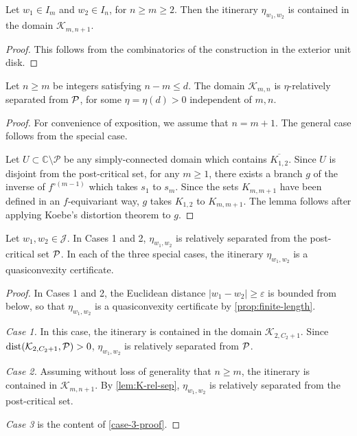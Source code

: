 \begin{lemma}
Let $w_1 \in I_m$ and $w_2 \in I_n$, for $n \geq m \geq 2$. Then the itinerary $\eta_{w_1,w_2}$ is contained in the domain $\mathcal K_{m,n+1}$.
\end{lemma}

\begin{proof}
    This follows from the combinatorics of the construction in the exterior unit disk. 
\end{proof}

\begin{lemma} \label{lem:K-rel-sep}
 Let $n \ge m$ be integers satisfying $n-m \leq d$. The domain $\mathcal K_{m,n}$ is $\eta$-relatively separated from $\operatorname{\mathcal P}$, for some $\eta=\eta(d)>0$ independent of $m,n$.
\end{lemma}

\begin{proof}
For convenience of exposition, we assume that $n = m+1$. The general case follows from the special case.

Let $U \subset \mathbb{C} \setminus \mathcal P$ be any simply-connected domain which contains $\overline{K_{1, 2}}$. Since $U$ is disjoint from the post-critical set, for any $m \ge 1$, there exists a branch $g$ of the inverse of $f^{\circ(m-1)}$ which takes $s_1$ to $s_m$.
Since the sets $K_{m, m+1}$ have been defined in an $f$-equivariant way, $g$ takes $K_{1,2}$ to $K_{m, m+1}$. The lemma follows after applying Koebe's distortion theorem to $g$.
\end{proof}


\begin{lemma}
\label{case 1 rel. sep}
Let $w_1,w_2 \in \mathcal J$. In Cases 1 and 2, $\eta_{w_1,w_2}$ is relatively separated from the post-critical set $\operatorname{\mathcal P}$. In each of the three special cases, the itinerary $\eta_{w_1,w_2}$ is a quasiconvexity certificate. 
\end{lemma}

\begin{proof}
In Cases 1 and 2, the Euclidean distance $|w_1 - w_2| \ge \varepsilon$ is bounded from below, so that $\eta_{w_1,w_2}$ is a quasiconvexity certificate by \cref{prop:finite-length}.

\emph{Case 1.} In this case, the itinerary is contained in the domain $\mathcal K_{2, C_2+1}$.
Since $\operatorname{dist}(\mathcal K_{2, C_2+1}, \mathcal P)>0$, $\eta_{w_1,w_2}$ is relatively separated from $\operatorname{\mathcal P}$.

\emph{Case 2.}
Assuming without loss of generality that $n \geq m$, the itinerary is contained in $\mathcal K_{m,n+1}$. By \cref{lem:K-rel-sep}, $\eta_{w_1,w_2}$ is relatively separated from the post-critical set.

\emph{Case 3} is the content of \cref{case-3-proof}.
\end{proof}

